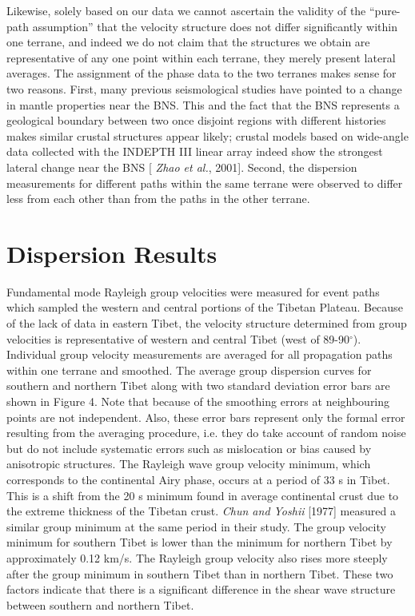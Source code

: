 \documentclass[12pt]{article}
\begin{document}
Likewise, solely based on our data we cannot ascertain the validity of the
  ``pure-path assumption'' that the
  velocity structure does not differ significantly within one terrane, and
  indeed we do not claim that the structures we obtain are representative of any
  one point within each terrane, they merely present lateral averages.  The
  assignment of the phase data to the two terranes makes sense for two reasons.
First, many previous seismological studies have pointed to a change in mantle
  properties near the BNS.  This and the
  fact that the BNS represents a geological boundary between two once disjoint
  regions with different histories makes similar crustal
  structures appear likely; crustal models based on wide-angle data collected with the INDEPTH
  III linear array indeed show the strongest lateral change near the BNS [{\it
    Zhao et al.}, 2001].  Second, the dispersion measurements for different paths within the same terrane
  were observed to differ less from each other than from the paths
  in the other terrane.


\section{Dispersion Results}

Fundamental mode Rayleigh group velocities were measured for event paths which sampled the western and
central portions of the Tibetan Plateau. Because of the lack of data in eastern Tibet, the velocity
structure determined from group velocities is representative of western and central Tibet (west of
89-90$^\circ$).  Individual group velocity measurements are averaged for all propagation
paths within one terrane and smoothed.   The average group dispersion curves for southern and northern Tibet along with
two standard deviation error bars are shown in Figure 4.  Note that because of the smoothing errors at neighbouring points are not independent. Also, these error bars represent only the formal error resulting from the averaging procedure, i.e. they do take account of random noise but do not include systematic errors such as mislocation or bias caused by anisotropic structures.  The Rayleigh wave group velocity minimum, which
corresponds to the continental Airy phase, occurs at a period of 33 s in Tibet.  This is a shift from the
20 s minimum found in average continental crust due to the extreme thickness of the Tibetan crust.  {\it
Chun and Yoshii} [1977] measured a similar group minimum at the same period in their study. The group
velocity minimum for southern Tibet is lower than the minimum for northern Tibet by approximately 0.12
km/s.  The Rayleigh group velocity also rises more steeply after the group minimum in southern Tibet than
in northern Tibet.  These two factors indicate that there is a significant difference in the shear wave
structure between southern and northern Tibet.
\end{document}
